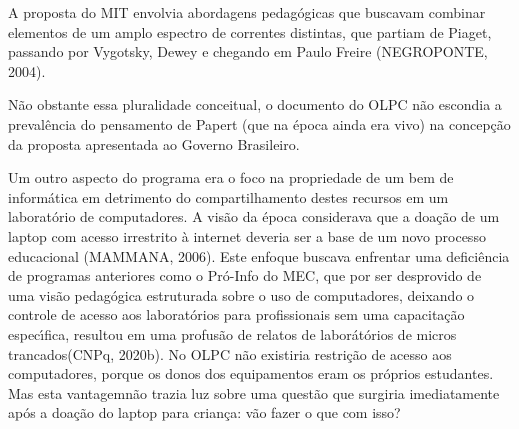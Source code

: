 \documentclass[
12pt,		%
openright,	%
twoside,  %
a4paper,			%
chapter=TITLE,		%
english,			%
french,				%
spanish,			%
brazil				%
]{USPSC-classe/USPSC}
\begin{document}
A proposta do MIT envolvia abordagens pedag\'ogicas que buscavam combinar elementos de um amplo espectro de correntes distintas, que partiam de Piaget, passando por Vygotsky, Dewey e chegando em Paulo Freire  (NEGROPONTE, 2004).










N\~ao obstante essa pluralidade conceitual, o documento do OLPC n\~ao escondia a preval\^encia do pensamento de Papert (que na \'epoca ainda era vivo) na concep\c{c}\~ao da proposta apresentada ao Governo Brasileiro.











\noindent\begin{center}\mbox{\centering{}}\end{center}


Um outro aspecto do programa era o foco na \textquotedbl propriedade de um bem de inform\'atica em detrimento do compartilhamento destes recursos em um laborat\'orio de computadores\textquotedbl . A vis\~ao da \'epoca considerava que a doa\c{c}\~ao de um laptop com acesso irrestrito \`a internet deveria ser a base de um novo processo educacional  (MAMMANA, 2006). Este enfoque buscava enfrentar uma defici\^encia de programas anteriores como o Pr\'o-Info do MEC, que por ser desprovido de uma vis\~ao pedag\'ogica estruturada sobre o uso de computadores, deixando o controle de acesso aos laborat\'orios para profissionais sem uma capacita\c{c}\~ao espec\'{\i}fica, resultou em uma profus\~ao de relatos de \textquotedbl labor\'at\'orios de micros trancados\textquotedbl   (CNPq, 2020b). No OLPC n\~ao existiria restri\c{c}\~ao de acesso aos computadores, porque os donos dos equipamentos eram os pr\'oprios estudantes. Mas esta \textquotedbl vantagem\textquotedbl  n\~ao trazia luz sobre  uma quest\~ao que surgiria imediatamente ap\'os a doa\c{c}\~ao do laptop para crian\c{c}a: v\~ao fazer o que com isso?
\end{document}
